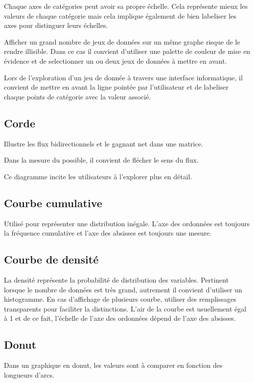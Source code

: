 \documentclass[a4paper,12pt]{article}
\begin{document}
\begin{multicols}{2}
Chaque axes de catégories peut avoir sa propre échelle. Cela représente mieux les valeurs de chaque catégorie mais cela implique également de bien labeliser les axes pour distinguer leurs échelles. \autocite{jonathanschwabishRelationship2021}

Afficher un grand nombre de jeux de données sur un même graphe risque de le rendre illisible. \autocite{jonathanschwabishRelationship2021} Dans ce cas il convient d'utiliser une palette de couleur de mise en évidence et de selectionner un ou deux jeux de données à mettre en avant.

Lors de l'exploration d'un jeu de donnée à travers une interface informatique, il convient de mettre en avant la ligne pointée par l'utilisateur et de labeliser chaque points de catégorie avec la valeur associé. \autocite{sosulskiGraphics2019}
\subsection*{Corde}
\label{sec:org070e384}
Illustre les flux bidirectionnels et le gagnant net dans une matrice. \autocite{alansmithLexiqueVisuel}

Dans la mesure du possible, il convient de flécher le sens du flux.

Ce diagramme incite les utilisateurs à l'explorer plus en détail. \autocite{jonathanschwabishRelationship2021}
\subsection*{Courbe cumulative}
\label{sec:org5aefd2c}
Utilisé pour représenter une distribution inégale. L'axe des ordonnées est toujours la fréquence cumulative et l'axe des absisses est toujours une mesure. \autocite{alansmithLexiqueVisuel}
\subsection*{Courbe de densité}
\label{sec:org8eaadff}
La densité représente la probabilité de distribution des variables. \autocite{sosulskiGraphics2019} Pertinent lorsque le nombre de données est très grand, autrement il convient d'utiliser un histogramme. \autocite{wilkeVisualizingManyDistributions2019} En cas d'affichage de plusieurs courbe, utiliser  des remplissages transparents pour faciliter la distinctions. L'air de la courbe est usuellement égal à 1 et de ce fait, l'échelle de l'axe des ordonnées dépend de l'axe des absisses. \autocite{wilkeVisualizingManyDistributions2019}
\subsection*{Donut}
\label{sec:org7fed7bc}
Dans un graphique en donut, les valeurs sont à comparer en fonction des longueurs d'arcs.


\end{multicols}
\end{document}
